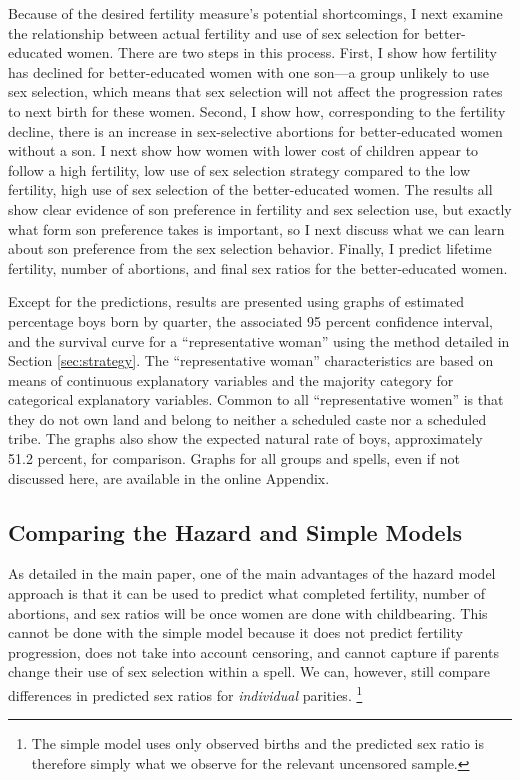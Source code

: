 \documentclass[12pt,letterpaper]{article}
\begin{document}
Because of the desired fertility measure's potential shortcomings, I next examine the 
relationship between actual fertility and use of sex selection for better-educated women.
There are two steps in this process.
First, I show how fertility has declined for better-educated women with one son---a group 
unlikely to use sex selection, which means that sex selection will not affect the 
progression rates to next birth for these women.
Second, I show how, corresponding to the fertility decline, there is an increase in
sex-selective abortions for better-educated women without a son.
I next show how women with lower cost of children appear to follow a high fertility, low
use of sex selection strategy compared to the low fertility, high use of sex selection of
the better-educated women.
The results all show clear evidence of son preference in fertility and sex selection use, 
but exactly what form son preference takes is important, so I next discuss what we can
learn about son preference from the sex selection behavior.
Finally, I predict lifetime fertility, number of abortions, and final sex ratios for
the better-educated women.

Except for the predictions, results are presented using graphs of estimated percentage boys 
born by quarter, the associated 95 percent confidence interval, and the survival curve for 
a ``representative woman'' using the method detailed in Section \ref{sec:strategy}.
The ``representative woman'' characteristics are based on means of continuous 
explanatory variables and the majority category for categorical explanatory variables.
Common to all ``representative women'' is that they do not own land and belong to neither 
a scheduled caste nor a scheduled tribe.
The graphs also show the expected natural rate of boys, approximately 51.2 percent, for
comparison.
Graphs for all groups and spells, even if not discussed here, are available in 
the online Appendix.


\subsection{Comparing the Hazard and Simple Models}

As detailed in the main paper, one of the main advantages of the hazard model 
approach is that it can be used to predict what completed fertility, number of abortions, 
and sex ratios will be once women are done with childbearing.
This cannot be done with the simple model because it does not predict fertility
progression, does not take into account censoring, and cannot capture if parents
change their use of sex selection within a spell.
We can, however, still compare differences in predicted sex ratios for 
\emph{individual} parities.%
\footnote{
The simple model uses only observed births and the predicted sex ratio is 
therefore simply what we observe for the relevant uncensored sample.
}
\end{document}
